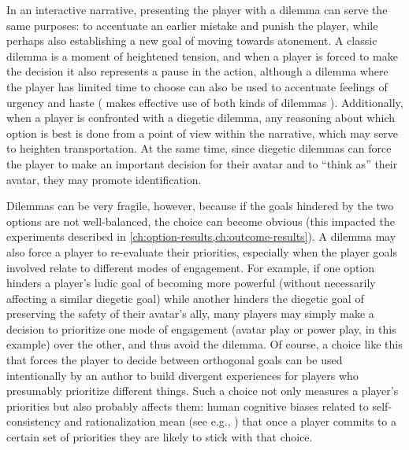In an interactive narrative, presenting the player with a dilemma can serve the same purposes: to accentuate an earlier mistake and punish the player, while perhaps also establishing a new goal of moving towards atonement.
%
A classic dilemma is a moment of heightened tension, and when a player is forced to make the decision it also represents a pause in the action, although a dilemma where the player has limited time to choose can also be used to accentuate feelings of urgency and haste ( makes effective use of both kinds of dilemmas \citep{TheWalkingDead}).
%
Additionally, when a player is confronted with a diegetic dilemma, any reasoning about which option is best is done from a point of view within the narrative, which may serve to heighten transportation.
%
At the same time, since diegetic dilemmas can force the player to make an important decision for their avatar and to ``think as'' their avatar, they may promote identification.


Dilemmas can be very fragile, however, because if the goals hindered by the two options are not well-balanced, the choice can become obvious (this impacted the experiments described in \cref{ch:option-results,ch:outcome-results}).
%
A dilemma may also force a player to re-evaluate their priorities, especially when the player goals involved relate to different modes of engagement.
%
For example, if one option hinders a player's ludic goal of becoming more powerful (without necessarily affecting a similar diegetic goal) while another hinders the diegetic goal of preserving the safety of their avatar's ally, many players may simply make a decision to prioritize one mode of engagement (avatar play or power play, in this example) over the other, and thus avoid the dilemma.
%
Of course, a choice like this that forces the player to decide between orthogonal goals can be used intentionally by an author to build divergent experiences for players who presumably prioritize different things.
%
Such a choice not only measures a player's priorities but also probably affects them: human cognitive biases related to self-consistency and rationalization mean (see e.g., \citep{Hall2012}) that once a player commits to a certain set of priorities they are likely to stick with that choice.


